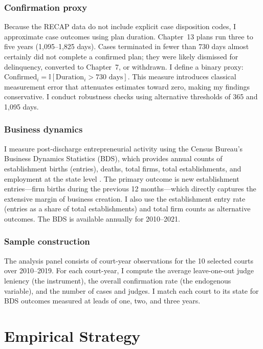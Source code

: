 \documentclass[12pt]{article}
\newcommand{\ind}{\mathbb{I}}
\begin{document}
\subsubsection*{Confirmation proxy} Because the RECAP data do not include explicit case disposition codes, I approximate case outcomes using plan duration. Chapter~13 plans run three to five years (1,095--1,825 days). Cases terminated in fewer than 730 days almost certainly did not complete a confirmed plan; they were likely dismissed for delinquency, converted to Chapter~7, or withdrawn. I define a binary proxy: $\text{Confirmed}_i = \ind[\text{Duration}_i > 730 \text{ days}]$. This measure introduces classical measurement error that attenuates estimates toward zero, making my findings conservative. I conduct robustness checks using alternative thresholds of 365 and 1,095 days.

\subsubsection*{Business dynamics} I measure post-discharge entrepreneurial activity using the Census Bureau's Business Dynamics Statistics (BDS), which provides annual counts of establishment births (entries), deaths, total firms, total establishments, and employment at the state level \citep{haltiwanger2020}. The primary outcome is new establishment entries---firm births during the previous 12 months---which directly captures the extensive margin of business creation. I also use the establishment entry rate (entries as a share of total establishments) and total firm counts as alternative outcomes. The BDS is available annually for 2010--2021.

\subsubsection*{Sample construction} The analysis panel consists of court-year observations for the 10 selected courts over 2010--2019. For each court-year, I compute the average leave-one-out judge leniency (the instrument), the overall confirmation rate (the endogenous variable), and the number of cases and judges. I match each court to its state for BDS outcomes measured at leads of one, two, and three years.



\section{Empirical Strategy}
\label{sec:strategy}
\end{document}
